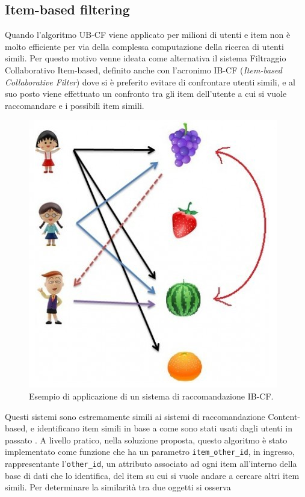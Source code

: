 \subsection{Item-based filtering}
Quando l'algoritmo UB-CF viene applicato per milioni di utenti e item non è molto efficiente per via della complessa computazione della 
ricerca di utenti simili. Per questo motivo venne ideata come alternativa il sistema Filtraggio Collaborativo Item-based, 
definito anche con l'acronimo IB-CF (\textit{Item-based Collaborative Filter}) dove si è preferito evitare di confrontare utenti 
simili, e al suo posto viene effettuato un confronto tra gli item dell'utente a cui si vuole raccomandare e i possibili item simili.
%
\begin{figure}[ht!]
    \centering
    \includegraphics[scale=0.5]{images/IB_CF_ex.png}
    \caption{Esempio di applicazione di un sistema di raccomandazione IB-CF.}
    \label{fig:IB_CF}
\end{figure}
\hfill\break
Questi sistemi sono estremamente simili ai sistemi di raccomandazione Content-based, e identificano item simili in base a come sono 
stati usati dagli utenti in passato \cite{item-based-collaborative-filtering}.\hfill\break
A livello pratico, nella soluzione proposta, questo algoritmo è stato implementato come funzione che ha un 
parametro \texttt{item\_other\_id}, in ingresso, rappresentante l'\texttt{other\_id}, un attributo associato ad ogni item all'interno della base di dati 
che lo identifica, del item su cui si vuole andare a cercare altri item simili. Per determinare la similarità tra due oggetti si osserva 
